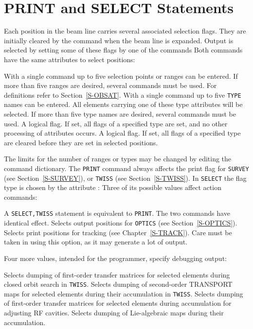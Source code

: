 \section{PRINT and SELECT Statements}
\label{S-PRINT}
Each position in the beam line
carries several associated selection flags.
They are initially cleared by the  command
when the beam line is expanded.
Output is selected by setting some of these flags by one of the commands
Both commands have the same attributes to select positions:
\begin{mylist}
With a single command up to five selection points or ranges
can be entered.
If more than five ranges are desired,
several commands must be used.
For definitions refer to Section~\ref{S-OBSAT}.
With a single command up to five {\tt TYPE} names can be entered.
All elements carrying one of these type attributes will be selected.
If more than five type names are desired,
several commands must be used.
A logical flag.
If set, all flags of a specified type are set,
and no other processing of attributes occurs.
A logical flag.
If set, all flags of a specified type are cleared
before they are set in selected positions.
\end{mylist}
The limits for the number of ranges or types may be changed by editing
the command dictionary.
The {\tt PRINT} command always affects the print flag for
{\tt SURVEY} (see Section~\ref{S-SURVEY}), or
{\tt TWISS} (see Section~\ref{S-TWISS}).
In {\tt SELECT} the flag type is chosen by the attribute :
Three of its possible values affect action commands:
\begin{mylist}
A {\tt SELECT,TWISS} statement is equivalent to {\tt PRINT}.
The two commands
have identical effect.
Selects output positions for {\tt OPTICS} (see Section~\ref{S-OPTICS}).
Selects print positions for tracking (see Chapter~\ref{S-TRACK}).
Care must be taken in using this option, as it may generate a lot of
output.
\end{mylist}
Four more values, intended for the programmer, specify debugging output:
\begin{mylist}
Selects dumping of first-order transfer matrices for selected
elements during closed orbit search in {\tt TWISS}.
Selects dumping of second-order TRANSPORT maps for selected
elements during their accumulation in {\tt TWISS}.
Selects dumping of first-order transfer matrices for selected
elements during accumulation for adjusting RF cavities.
Selects dumping of Lie-algebraic maps during their accumulation.
\end{mylist}
